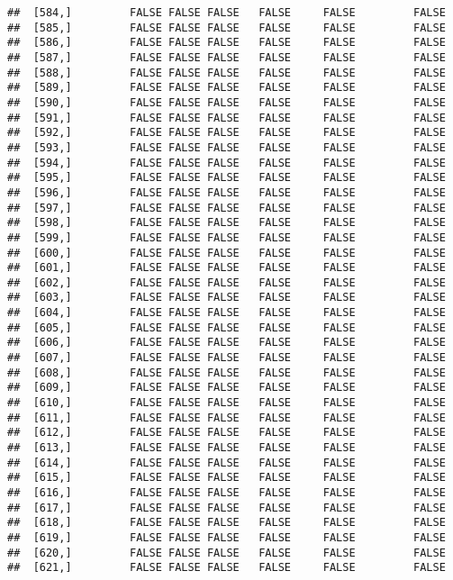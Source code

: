 \documentclass[
]{article}
\begin{document}
\begin{verbatim}
##  [584,]         FALSE FALSE FALSE   FALSE     FALSE         FALSE
##  [585,]         FALSE FALSE FALSE   FALSE     FALSE         FALSE
##  [586,]         FALSE FALSE FALSE   FALSE     FALSE         FALSE
##  [587,]         FALSE FALSE FALSE   FALSE     FALSE         FALSE
##  [588,]         FALSE FALSE FALSE   FALSE     FALSE         FALSE
##  [589,]         FALSE FALSE FALSE   FALSE     FALSE         FALSE
##  [590,]         FALSE FALSE FALSE   FALSE     FALSE         FALSE
##  [591,]         FALSE FALSE FALSE   FALSE     FALSE         FALSE
##  [592,]         FALSE FALSE FALSE   FALSE     FALSE         FALSE
##  [593,]         FALSE FALSE FALSE   FALSE     FALSE         FALSE
##  [594,]         FALSE FALSE FALSE   FALSE     FALSE         FALSE
##  [595,]         FALSE FALSE FALSE   FALSE     FALSE         FALSE
##  [596,]         FALSE FALSE FALSE   FALSE     FALSE         FALSE
##  [597,]         FALSE FALSE FALSE   FALSE     FALSE         FALSE
##  [598,]         FALSE FALSE FALSE   FALSE     FALSE         FALSE
##  [599,]         FALSE FALSE FALSE   FALSE     FALSE         FALSE
##  [600,]         FALSE FALSE FALSE   FALSE     FALSE         FALSE
##  [601,]         FALSE FALSE FALSE   FALSE     FALSE         FALSE
##  [602,]         FALSE FALSE FALSE   FALSE     FALSE         FALSE
##  [603,]         FALSE FALSE FALSE   FALSE     FALSE         FALSE
##  [604,]         FALSE FALSE FALSE   FALSE     FALSE         FALSE
##  [605,]         FALSE FALSE FALSE   FALSE     FALSE         FALSE
##  [606,]         FALSE FALSE FALSE   FALSE     FALSE         FALSE
##  [607,]         FALSE FALSE FALSE   FALSE     FALSE         FALSE
##  [608,]         FALSE FALSE FALSE   FALSE     FALSE         FALSE
##  [609,]         FALSE FALSE FALSE   FALSE     FALSE         FALSE
##  [610,]         FALSE FALSE FALSE   FALSE     FALSE         FALSE
##  [611,]         FALSE FALSE FALSE   FALSE     FALSE         FALSE
##  [612,]         FALSE FALSE FALSE   FALSE     FALSE         FALSE
##  [613,]         FALSE FALSE FALSE   FALSE     FALSE         FALSE
##  [614,]         FALSE FALSE FALSE   FALSE     FALSE         FALSE
##  [615,]         FALSE FALSE FALSE   FALSE     FALSE         FALSE
##  [616,]         FALSE FALSE FALSE   FALSE     FALSE         FALSE
##  [617,]         FALSE FALSE FALSE   FALSE     FALSE         FALSE
##  [618,]         FALSE FALSE FALSE   FALSE     FALSE         FALSE
##  [619,]         FALSE FALSE FALSE   FALSE     FALSE         FALSE
##  [620,]         FALSE FALSE FALSE   FALSE     FALSE         FALSE
##  [621,]         FALSE FALSE FALSE   FALSE     FALSE         FALSE

\end{verbatim}
\end{document}
